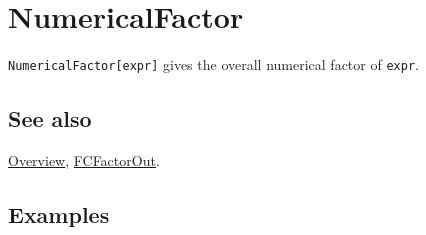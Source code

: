 \documentclass[../FeynCalcManual.tex]{subfiles}
\begin{document}
\hypertarget{numericalfactor}{
\section{NumericalFactor}\label{numericalfactor}}

\texttt{NumericalFactor[\allowbreak{}expr]} gives the overall numerical
factor of \texttt{expr}.

\subsection{See also}

\hyperlink{toc}{Overview}, \hyperlink{fcfactorout}{FCFactorOut}.

\subsection{Examples}
\end{document}
